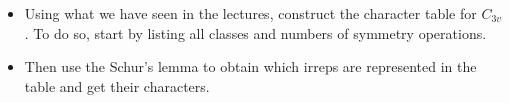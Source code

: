\begin{itemize}
\item Using what we have seen in the lectures, construct the character table for $C_{3v}$. To do so, start by listing all classes and numbers of symmetry operations. 
\item Then use the Schur's lemma to obtain which irreps are represented in the table and get their characters.
\end{itemize}